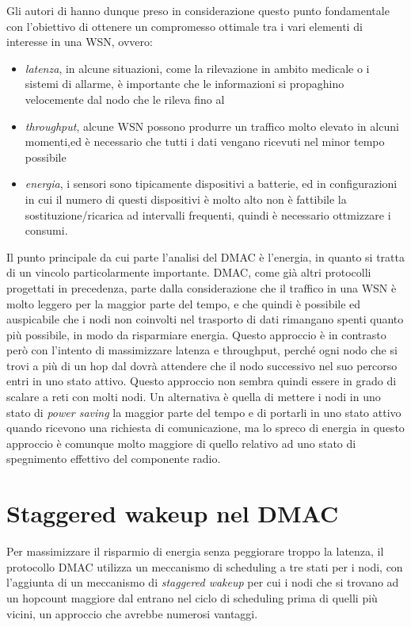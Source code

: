 \documentclass[twoside,11pt,a4paper,italian,openany]{book}
\begin{document}
Gli autori di \cite{DMAC} hanno dunque preso in considerazione questo punto fondamentale con l'obiettivo di ottenere un compromesso ottimale tra i vari elementi di interesse in una WSN, ovvero:

\begin{itemize}

\item \emph{latenza}, in alcune situazioni, come la rilevazione in ambito medicale o 
i sistemi di allarme, è importante che le informazioni si propaghino velocemente dal nodo che le 
rileva fino al \sink

\item \emph{throughput}, alcune WSN possono produrre un traffico molto elevato in alcuni momenti,ed è necessario che tutti i dati vengano ricevuti nel minor tempo possibile 

\item \emph{energia}, i sensori sono tipicamente dispositivi a batterie, ed in configurazioni
in cui il numero di questi dispositivi è molto alto non è fattibile la sostituzione/ricarica ad 
intervalli frequenti, quindi è necessario ottmizzare i consumi.

\end{itemize}

Il punto principale da cui parte l'analisi del DMAC è l'energia, in quanto si tratta di un 
vincolo particolarmente importante. DMAC, come già altri protocolli\cite{SMAC}\cite{TMAC} 
progettati in precedenza, parte dalla considerazione che il traffico in una WSN è molto leggero 
per la maggior parte del tempo, e che quindi è 
possibile ed auspicabile che i nodi non coinvolti nel trasporto di dati rimangano spenti 
quanto più possibile, in modo da risparmiare energia. 
Questo approccio è in contrasto però con l'intento di massimizzare latenza e throughput, 
perché ogni nodo che si trovi a più di un hop dal \sink dovrà attendere che il nodo successivo 
nel suo percorso entri in uno stato attivo. Questo approccio non sembra quindi essere in grado 
di scalare a reti con molti nodi. 
Un alternativa è quella di mettere i nodi in uno stato di \emph{power saving} la 
maggior parte del tempo e di portarli in uno stato attivo quando ricevono una richiesta di 
comunicazione, ma lo spreco di energia in questo approccio è comunque molto maggiore di quello 
relativo ad uno stato di spegnimento effettivo del componente radio. 

\section{Staggered wakeup nel DMAC}
Per massimizzare il risparmio di energia senza peggiorare troppo la latenza, 
il protocollo DMAC utilizza un meccanismo di scheduling a tre stati per i nodi, 
con l'aggiunta di un meccanismo di \emph{staggered wakeup} per cui i nodi che si trovano ad un 
hopcount maggiore dal \sink entrano nel ciclo di scheduling prima di quelli più vicini, un 
approccio che avrebbe numerosi vantaggi.
\end{document}
